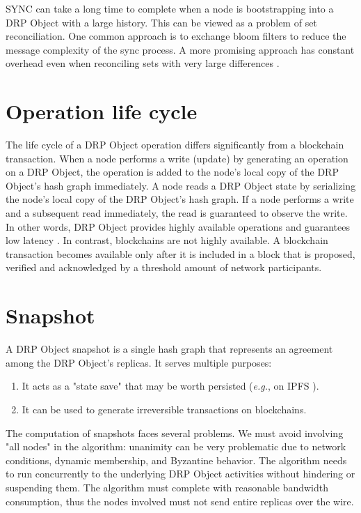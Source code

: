 \documentclass{article}
\begin{document}
SYNC can take a long time to complete when a node is bootstrapping into a DRP Object with a large history. This can be viewed as a problem of set reconciliation. One common approach is to exchange bloom filters to reduce the message complexity of the sync process. A more promising approach has constant overhead even when reconciling sets with very large differences \cite{PRIBLT}.

\section{Operation life cycle}
\label{sec:headings}

The life cycle of a DRP Object operation differs significantly from a blockchain transaction. When a node performs a write (update) by generating an operation on a DRP Object, the operation is added to the node's local copy of the DRP Object's hash graph immediately. A node reads a DRP Object state by serializing the node's local copy of the DRP Object's hash graph. If a node performs a write and a subsequent read immediately, the read is guaranteed to observe the write. In other words, DRP Object provides highly available operations and guarantees low latency \cite{HAT}. In contrast, blockchains are not highly available. A blockchain transaction becomes available only after it is included in a block that is proposed, verified and acknowledged by a threshold amount of network participants.

\section{Snapshot}
\label{sec:headings}

A DRP Object snapshot is a single hash graph that represents an agreement among the DRP Object's replicas. It serves multiple purposes:
\begin{enumerate}
    \item It acts as a "state save" that may be worth persisted (\textit{e.g.}, on IPFS \cite{IPFS}).
    \item It can be used to generate irreversible transactions on blockchains.
\end{enumerate}

The computation of snapshots faces several problems. We must avoid involving "all nodes" in the algorithm: unanimity can be very problematic due to network conditions, dynamic membership, and Byzantine behavior. The algorithm needs to run concurrently to the underlying DRP Object activities without hindering or suspending them. The algorithm must complete with reasonable bandwidth consumption, thus the nodes involved must not send entire replicas over the wire.
\end{document}
